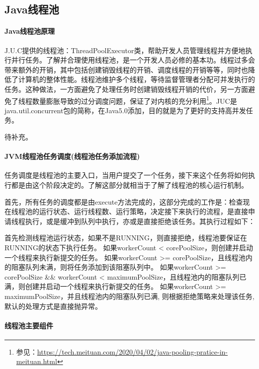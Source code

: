 \documentclass[../../../interview-questions.tex]{subfiles}
\begin{document}
\subsection{Java线程池}

\paragraph{Java线程池原理}

J.U.C提供的线程池：ThreadPoolExecutor类，帮助开发人员管理线程并方便地执行并行任务。了解并合理使用线程池，是一个开发人员必修的基本功。线程过多会带来额外的开销，其中包括创建销毁线程的开销、调度线程的开销等等，同时也降低了计算机的整体性能。线程池维护多个线程，等待监督管理者分配可并发执行的任务。这种做法，一方面避免了处理任务时创建销毁线程开销的代价，另一方面避免了线程数量膨胀导致的过分调度问题，保证了对内核的充分利用\footnote{参见：\url{https://tech.meituan.com/2020/04/02/java-pooling-pratice-in-meituan.html}}。JUC是java.util.concurrent包的简称，在Java5.0添加，目的就是为了更好的支持高并发任务。

待补充。

\paragraph{JVM线程池任务调度(线程池任务添加流程)}

任务调度是线程池的主要入口，当用户提交了一个任务，接下来这个任务将如何执行都是由这个阶段决定的。了解这部分就相当于了解了线程池的核心运行机制。

首先，所有任务的调度都是由execute方法完成的，这部分完成的工作是：检查现在线程池的运行状态、运行线程数、运行策略，决定接下来执行的流程，是直接申请线程执行，或是缓冲到队列中执行，亦或是直接拒绝该任务。其执行过程如下：

首先检测线程池运行状态，如果不是RUNNING，则直接拒绝，线程池要保证在RUNNING的状态下执行任务。
如果workerCount < corePoolSize，则创建并启动一个线程来执行新提交的任务。
如果workerCount >= corePoolSize，且线程池内的阻塞队列未满，则将任务添加到该阻塞队列中。
如果workerCount >= corePoolSize \&\& workerCount < maximumPoolSize，且线程池内的阻塞队列已满，则创建并启动一个线程来执行新提交的任务。
如果workerCount >= maximumPoolSize，并且线程池内的阻塞队列已满, 则根据拒绝策略来处理该任务, 默认的处理方式是直接抛异常。

\paragraph{线程池主要组件}
\end{document}
